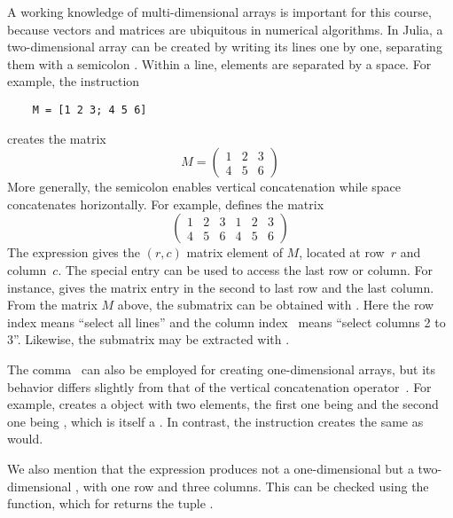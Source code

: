 A working knowledge of multi-dimensional arrays is important for this course,
because vectors and matrices are ubiquitous in numerical algorithms.
In Julia, a two-dimensional array can be created by writing its lines one by one,
separating them with a semicolon \julia{;}.
Within a line, elements are separated by a space.
For example,
the instruction
\begin{verbatim}
    M = [1 2 3; 4 5 6]
\end{verbatim}
creates the matrix
\[
    M =
    \begin{pmatrix}
        1 & 2 & 3 \\ 4 & 5 & 6
    \end{pmatrix}
\]
More generally,
the semicolon enables vertical concatenation
while space concatenates horizontally.
For example, \julia{[M M]} defines the matrix
\[
    \begin{pmatrix}
        1 & 2 & 3 & 1 & 2 & 3 \\ 4 & 5 & 6 & 4 & 5 & 6
    \end{pmatrix}
\]
The expression  gives the $(r, c)$ matrix element of $M$,
located at row~$r$ and column~$c$.
The special entry  can be used to access the last row or column.
For instance,  gives the matrix entry in the second to last row and the last column.
From the matrix $M$ above,
the submatrix \julia{[2  3; 5 6]} can be obtained with .
Here the row index \julia{:} means ``select all lines'' and the column index~ means ``select columns 2 to 3''.
Likewise, the submatrix \julia{[1 3; 4 6]} may be extracted with .
\begin{remark}
    The comma~\julia{,} can also be employed for creating one-dimensional arrays,
    but its behavior differs slightly from that of the vertical concatenation operator~\julia{;}.
    For example,  creates a  object with two elements,
    the first one being  and the second one being \julia{[1; 3]}, which is itself a .
    In contrast, the instruction  creates the same  as \julia{[1; 2; 3]} would.

    We also mention that the expression  produces not a one-dimensional  but a two-dimensional ,
    with one row and three columns.
    This can be checked using the  function,
    which for  returns the tuple .
\end{remark}

